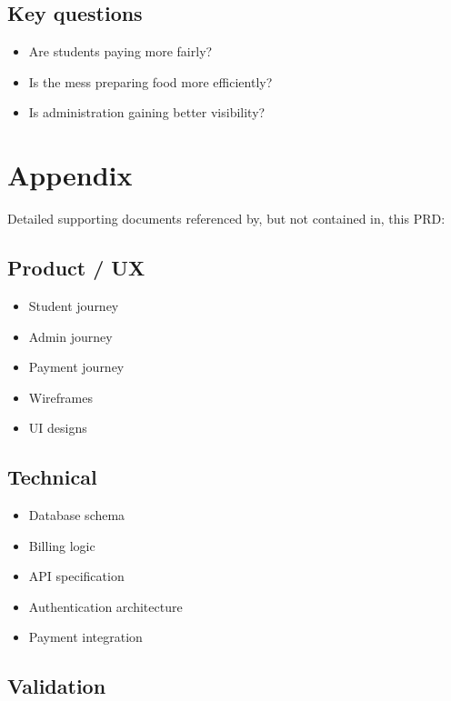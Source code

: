 \documentclass[12pt,a4paper]{article}
\begin{document}
\subsection*{Key questions}

\begin{itemize}
    \item Are students paying more fairly?
    \item Is the mess preparing food more efficiently?
    \item Is administration gaining better visibility?
\end{itemize}


\section{Appendix}

Detailed supporting documents referenced by, but not contained in, this PRD:

\subsection*{Product / UX}

\begin{itemize}
    \item Student journey
    \item Admin journey
    \item Payment journey
    \item Wireframes
    \item UI designs
\end{itemize}

\subsection*{Technical}

\begin{itemize}
    \item Database schema
    \item Billing logic
    \item API specification
    \item Authentication architecture
    \item Payment integration
\end{itemize}

\subsection*{Validation}
\end{document}
